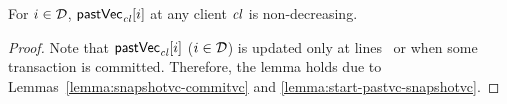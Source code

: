 \begin{applemma} \label{lemma:pastvc-nondecreasing}
  For $i \in \mathcal{D}$, ${\sf pastVec}_{\mathit{cl}}[i]$ at any client $\mathit{cl}$
  is non-decreasing.
\end{applemma}

\begin{proof} \label{proof:pastvc-nondecreasing}
  Note that ${\sf pastVec}_{\mathit{cl}}[i]$ ($i \in \mathcal{D}$) is updated only
  at lines~\code{\ref{alg:unistore-client}}{\ref{line:commitcausaltx-pastvc}}
  or \code{\ref{alg:unistore-client}}{\ref{line:commitstrongtx-pastvc}}
  when some transaction is committed.
  Therefore, the lemma holds due to Lemmas~\ref{lemma:snapshotvc-commitvc}
  and \ref{lemma:start-pastvc-snapshotvc}.
\end{proof}
